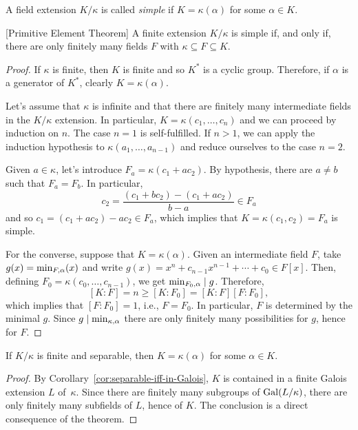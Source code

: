 \begin{defn}
    A field extension $K / \kappa$ is called \textsl{simple} if $K = \kappa(\alpha)$ for some $\alpha \in K$.
\end{defn}

\begin{thm}
    {\rm[Primitive Element Theorem]} A finite extension\/ $K / \kappa$ is simple if, and only if, there are only finitely many fields\/ $F$ with\/ $\kappa \subseteq F \subseteq K$.
\end{thm}

\begin{proof}
    If $\kappa$ is finite, then $K$ is finite and so $K^*$ is a cyclic group. Therefore, if $\alpha$ is a generator of $K^*$, clearly $K=\kappa(\alpha)$.

    Let's assume that $\kappa$ is infinite and that there are finitely many intermediate fields in the $K/\kappa$ extension. In particular, $K=\kappa(c_1,\dots,c_n)$ and we can proceed by induction on $n$. The case $n=1$ is self-fulfilled. If $n>1$, we can apply the induction hypothesis to $\kappa(a_1,\dots,a_{n-1})$ and reduce ourselves to the case $n=2$.
    
    Given $a\in\kappa$, let's introduce $F_a=\kappa(c_1+ac_2)$. By hypothesis, there are $a\ne b$ such that $F_a=F_b$. In particular,
    $$
        c_2 = \frac{(c_1+bc_2)-(c_1+ac_2)}{b-a}\in F_a
    $$
    and so $c_1=(c_1+ac_2)-ac_2\in F_a$, which implies that $K=\kappa(c_1,c_2)=F_a$ is simple.

    For the converse, suppose that $K=\kappa(\alpha)$. Given an intermediate field $F$, take $g(x)=\operatorname{min}_{F,\alpha}(x)$ and write $g(x)=x^n+c_{n-1}x^{n-1}+\cdots+c_0\in F[x]$. Then, defining $F_0=\kappa(c_0,\dots,c_{n-1})$, we get $\operatorname{min}_{F_0,\alpha}\mid g$. Therefore,
    $$
        [K:F] = n \ge [K:F_0]=[K:F][F:F_0],
    $$
    which implies that $[F:F_0]=1$, i.e., $F=F_0$. In particular, $F$ is determined by the minimal $g$. Since $g\mid\operatorname{min}_{\kappa,\alpha}$ there are only finitely many possibilities for $g$, hence for $F$.
    
\end{proof}

\begin{cor}
    If\/ $K / \kappa$ is finite and separable, then\/ $K = \kappa(\alpha)$ for some\/ $\alpha \in K$.
\end{cor}

\begin{proof}
    By Corollary~\ref{cor:separable-iff-in-Galois}, $K$ is contained in a finite Galois extension $L$ of~$\kappa$. Since there are finitely many subgroups of $\operatorname{Gal}(L/\kappa)$, there are only finitely many subfields of $L$, hence of $K$. The conclusion is a direct consequence of the theorem.
\end{proof}

